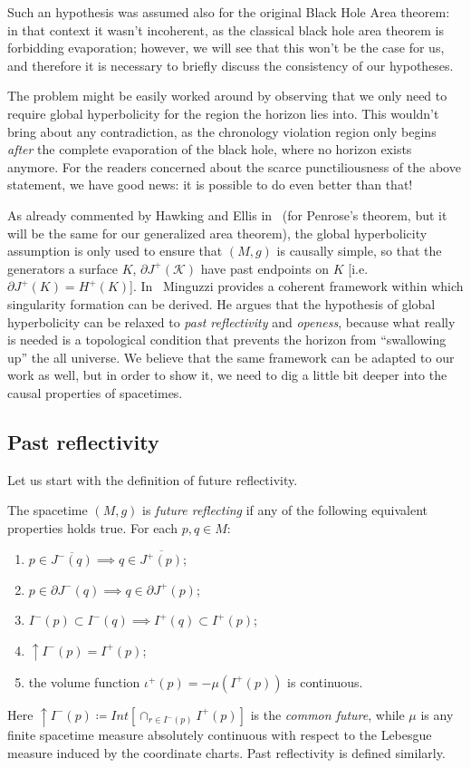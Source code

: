 Such an hypothesis was assumed also for the original Black Hole Area theorem: in that context it wasn't incoherent, as the classical black hole area theorem is forbidding evaporation; however, we will see that this won't be the case for us, and therefore it is necessary to briefly discuss the consistency of our hypotheses.

The problem might be easily worked around by observing that we only need to require global hyperbolicity for the region the horizon lies into. This wouldn't bring about any contradiction, as the chronology violation region only begins \emph{after} the complete evaporation of the black hole, where no horizon exists anymore. For the readers concerned about the scarce punctiliousness of the above statement, we have good news: it is possible to do even better than that! 

As already commented by Hawking and Ellis in~\cite[]{hawking1973large} (for Penrose's theorem, but it will be the same for our generalized area theorem), the global hyperbolicity assumption is only used to ensure that \((M, g)\) is causally simple, so that the generators a surface \(K\), \(\partial J^+(\mathscr{K})\) have past endpoints on \(K\) [i.e. \(\partial J^+(K) = H^+(K)\)].
In~\cite{minguzzi2020gravitational} Minguzzi provides a coherent framework within which singularity formation can be derived. He argues that the hypothesis of global hyperbolicity can be relaxed to \emph{past reflectivity} and \emph{openess}, because what really is needed is a topological condition that prevents the horizon from ``swallowing up'' the all universe. We believe that the same framework can be adapted to our work as well, but in order to show it, we need to dig a little bit deeper into the causal properties of spacetimes.

\subsection{Past reflectivity}
	\label{subsec:past-reflectivity}
	Let us start with the definition of future reflectivity.
	\begin{definition}
		The spacetime \((M,g)\) is \emph{future reflecting} if any of the following equivalent properties holds true. For each \(p, q\in M\):
		\begin{enumerate}
			\item \(p\in \overline{ J^-(q)} \implies q\in \overline{J^+(p)}\);
			\item  \(p\in \partial J^-(q) \implies q\in \partial J^+(p)\);
			\item \(I^-(p) \subset I^-(q) \implies I^+(q) \subset I^+(p)\);
			\item \(\uparrow I^-(p) = I^+(p)\);
			\item the volume function \(\iota^+(p) = - \mu(I^+(p))\) is continuous.
		\end{enumerate}
	\end{definition}
	Here \(\uparrow I^-(p) \coloneqq Int\left[\cap_{r\in I^-(p)}I^+(p)\right]\) is the \emph{common future}, while \(\mu\) is any finite spacetime measure absolutely continuous with respect to the Lebesgue measure induced by the coordinate charts. Past reflectivity is defined similarly.

